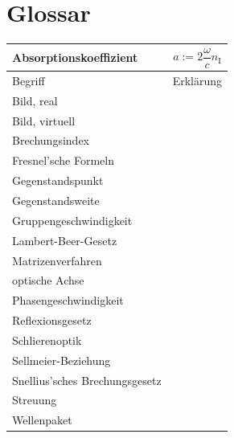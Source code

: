 \documentclass{article}
\begin{document}
\section{Glossar}
\begin{xltabular}{\linewidth}{p{6cm}|X}
	\hline\hline
		Absorptionskoeffizient & $$a := 2\frac{\omega}{c} n_\text{I}$$ \\
	\hline
		Begriff & Erklärung \\
	\hline
		Bild, real &  \\
	\hline
		Bild, virtuell &  \\
	\hline
		Brechungsindex &  \\
	\hline
		Fresnel'sche Formeln &  \\
	\hline
		Gegenstandspunkt &  \\
	\hline
		Gegenstandsweite &  \\
	\hline
		Gruppengeschwindigkeit &  \\
	\hline
		Lambert-Beer-Gesetz &  \\
	\hline
		Matrizenverfahren &  \\
	\hline
		optische Achse &  \\
	\hline
		Phasengeschwindigkeit &  \\
	\hline
		Reflexionsgesetz &  \\
	\hline
		Schlierenoptik &  \\
	\hline
		Sellmeier-Beziehung &  \\
	\hline
		Snellius'sches Brechungsgesetz &  \\
	\hline
		Streuung &  \\
	\hline
		Wellenpaket &  \\
	\hline\hline
\end{xltabular}
\end{document}
